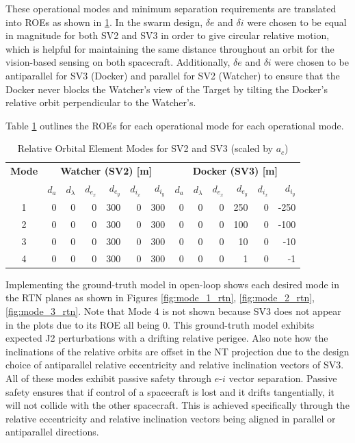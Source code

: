 These operational modes and minimum separation requirements are translated into ROEs as shown in \ref{tab:roe_modes_summary}. In the swarm design, $\delta e$ and $\delta i$ were chosen to be equal in magnitude for both SV2 and SV3 in order to give circular relative motion, which is helpful for maintaining the same distance throughout an orbit for the vision-based sensing on both spacecraft. Additionally, $\delta e$ and $\delta i$ were chosen to be antiparallel for SV3 (Docker) and parallel for SV2 (Watcher) to ensure that the Docker never blocks the Watcher's view of the Target by tilting the Docker's relative orbit perpendicular to the Watcher's.

Table \ref{tab:roe_modes_summary} outlines the ROEs for each operational mode for each operational mode.
\begin{table}[h!]
\centering
\begin{tabular}{|c|rrrrrr|rrrrrr|}
\hline
\textbf{Mode} & \multicolumn{6}{c|}{\textbf{Watcher (SV2) [m]}} & \multicolumn{6}{c|}{\textbf{Docker (SV3) [m]}} \\
\cline{2-13}
 & $d_a$ & $d_\lambda$ & $d_{e_x}$ & $d_{e_y}$ & $d_{i_x}$ & $d_{i_y}$ 
 & $d_a$ & $d_\lambda$ & $d_{e_x}$ & $d_{e_y}$ & $d_{i_x}$ & $d_{i_y}$ \\
\hline
1 & 0 & 0 & 0 & 300 & 0 & 300 & 0 & 0 & 0 & 250 & 0 & -250 \\
2 & 0 & 0 & 0 & 300 & 0 & 300 & 0 & 0 & 0 & 100 & 0 & -100 \\
3 & 0 & 0 & 0 & 300 & 0 & 300 & 0 & 0 & 0 & 10  & 0 & -10 \\
4 & 0 & 0 & 0 & 300 & 0 & 300 & 0 & 0 & 0 & 1   & 0 & -1 \\
\hline
\end{tabular}
\caption{Relative Orbital Element Modes for SV2 and SV3 (scaled by $a_c$)}
\label{tab:roe_modes_summary}
\end{table}

Implementing the ground-truth model in open-loop shows each desired mode in the RTN planes as shown in Figures \ref{fig:mode_1_rtn}, \ref{fig:mode_2_rtn}, \ref{fig:mode_3_rtn}. Note that Mode 4 is not shown because SV3 does not appear in the plots due to its ROE all being 0. This ground-truth model exhibits expected J2 perturbations with a drifting relative perigee. Also note how the inclinations of the relative orbits are offset in the NT projection due to the design choice of antiparallel relative eccentricity and relative inclination vectors of SV3. All of these modes exhibit passive safety through $e$-$i$ vector separation. Passive safety ensures that if control of a spacecraft is lost and it drifts tangentially, it will not collide with the other spacecraft. This is achieved specifically through the relative eccentricity and relative inclination vectors being aligned in parallel or antiparallel directions. 

